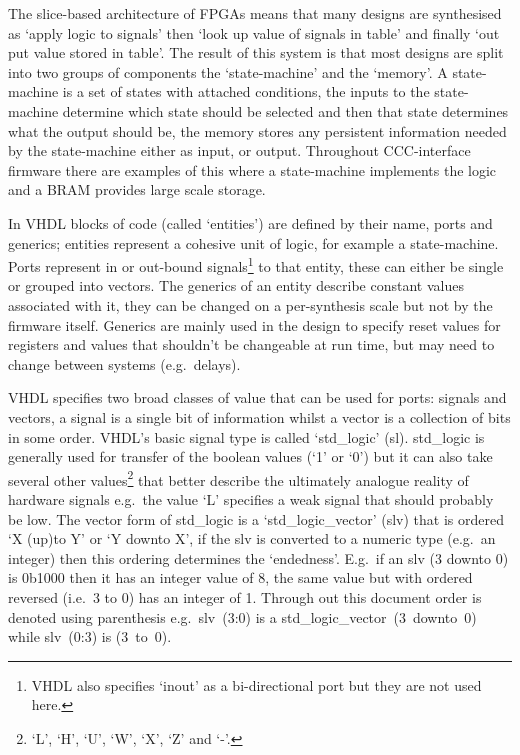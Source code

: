 The slice-based architecture of FPGAs means that many designs are synthesised as `apply logic to signals' then `look up value of signals in table' and finally `out put value stored in table'. The result of this system is that most designs are split into two groups of components the `state-machine' and the `memory'. A state-machine is a set of states with attached conditions, the inputs to the state-machine determine which state should be selected and then that state determines what the output should be, the memory stores any persistent information needed by the state-machine either as input, or output. Throughout CCC-interface firmware there are examples of this where a state-machine implements the logic and a BRAM provides large scale storage.

In VHDL blocks of code (called `entities') are defined by their name, ports and generics; entities represent a cohesive unit of logic, for example a state-machine. Ports represent in or out-bound signals\footnote{VHDL also specifies `inout' as a bi-directional port but they are not used here.} to that entity, these can either be single or grouped into vectors. The generics of an entity describe constant values associated with it, they can be changed on a per-synthesis scale but not by the firmware itself. Generics are mainly used in the design to specify reset values for registers and values that shouldn't be changeable at run time, but may need to change between systems (e.g.\ delays). 

VHDL specifies two broad classes of value that can be used for ports: signals and vectors, a signal is a single bit of information whilst a vector is a collection of bits in some order. VHDL's basic signal type is called `std\_logic' (sl). std\_logic is generally used for transfer of the boolean values (`1' or `0') but it can also take several other values\footnote{`L', `H', `U', `W', `X', `Z' and `-'.} that better describe the ultimately analogue reality of hardware signals e.g.\ the value `L' specifies a weak signal that should probably be low. The vector form of std\_logic is a `std\_logic\_vector' (slv) that is ordered `X (up)to Y' or `Y downto X', if the slv is converted to a numeric type (e.g.\ an integer) then this ordering determines the `endedness'. E.g.\ if an slv (3 downto 0) is 0b1000 then it has an integer value of 8, the same value but with ordered reversed (i.e.\ 3 to 0) has an integer of 1. Through out this document order is denoted using parenthesis e.g.\ slv~(3:0) is a std\_logic\_vector~(3~downto~0) while slv~(0:3) is (3~to~0).
